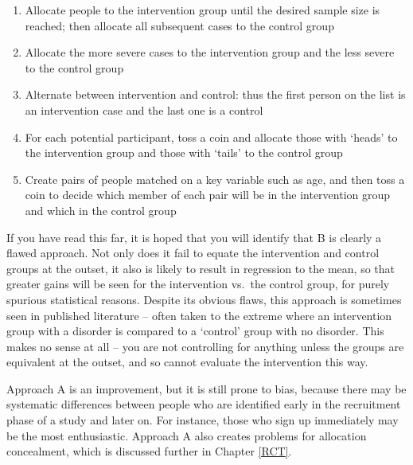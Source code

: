 \documentclass{krantz}
\providecommand{\tightlist}{%
\setlength{\itemsep}{0pt}\setlength{\parskip}{0pt}}
\begin{document}
\begin{enumerate}
\def\labelenumi{\Alph{enumi}.}
\tightlist
\item
  Allocate people to the intervention group until the desired sample size is reached; then allocate all subsequent cases to the control group\\
\item
  Allocate the more severe cases to the intervention group and the less severe to the control group\\
\item
  Alternate between intervention and control: thus the first person on the list is an intervention case and the last one is a control\\
\item
  For each potential participant, toss a coin and allocate those with `heads' to the intervention group and those with `tails' to the control group\\
\item
  Create pairs of people matched on a key variable such as age, and then toss a coin to decide which member of each pair will be in the intervention group and which in the control group
\end{enumerate}

If you have read this far, it is hoped that you will identify that B is clearly a flawed approach. Not only does it fail to equate the intervention and control groups at the outset, it also is likely to result in regression to the mean, so that greater gains will be seen for the intervention vs.~the control group, for purely spurious statistical reasons. Despite its obvious flaws, this approach is sometimes seen in published literature -- often taken to the extreme where an intervention group with a disorder is compared to a `control' group with no disorder. This makes no sense at all -- you are not controlling for anything unless the groups are equivalent at the outset, and so cannot evaluate the intervention this way.

Approach A is an improvement, but it is still prone to bias, because there may be systematic differences between people who are identified early in the recruitment phase of a study and later on. For instance, those who sign up immediately may be the most enthusiastic. Approach A also creates problems for allocation concealment, which is discussed further in Chapter \ref{RCT}.
\end{document}
